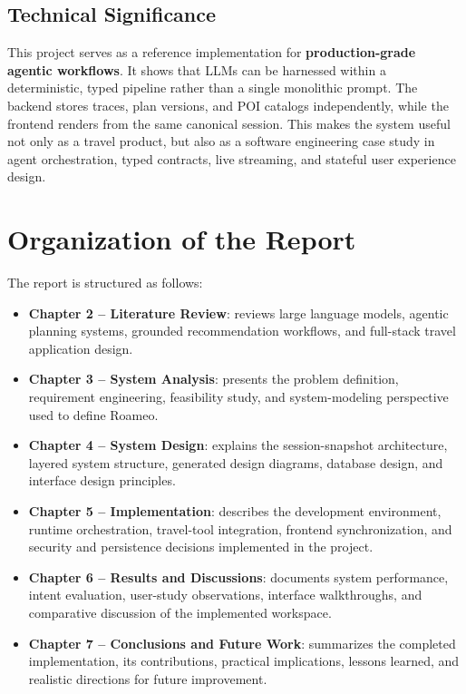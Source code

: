 \documentclass[12pt,a4paper]{report}
\begin{document}
\subsection{Technical Significance}
This project serves as a reference implementation for \textbf{production-grade agentic workflows}. It shows that LLMs can be harnessed within a deterministic, typed pipeline rather than a single monolithic prompt. The backend stores traces, plan versions, and POI catalogs independently, while the frontend renders from the same canonical session. This makes the system useful not only as a travel product, but also as a software engineering case study in agent orchestration, typed contracts, live streaming, and stateful user experience design.

\section{Organization of the Report}

The report is structured as follows:
{\small
\begin{itemize}[leftmargin=1.4cm, itemsep=2pt, topsep=2pt]
  \item \textbf{Chapter 2 -- Literature Review}: reviews large language models, agentic planning systems, grounded recommendation workflows, and full-stack travel application design.
  \item \textbf{Chapter 3 -- System Analysis}: presents the problem definition, requirement engineering, feasibility study, and system-modeling perspective used to define Roameo.
  \item \textbf{Chapter 4 -- System Design}: explains the session-snapshot architecture, layered system structure, generated design diagrams, database design, and interface design principles.
  \item \textbf{Chapter 5 -- Implementation}: describes the development environment, runtime orchestration, travel-tool integration, frontend synchronization, and security and persistence decisions implemented in the project.
  \item \textbf{Chapter 6 -- Results and Discussions}: documents system performance, intent evaluation, user-study observations, interface walkthroughs, and comparative discussion of the implemented workspace.
  \item \textbf{Chapter 7 -- Conclusions and Future Work}: summarizes the completed implementation, its contributions, practical implications, lessons learned, and realistic directions for future improvement.
\end{itemize}
}
\end{document}

